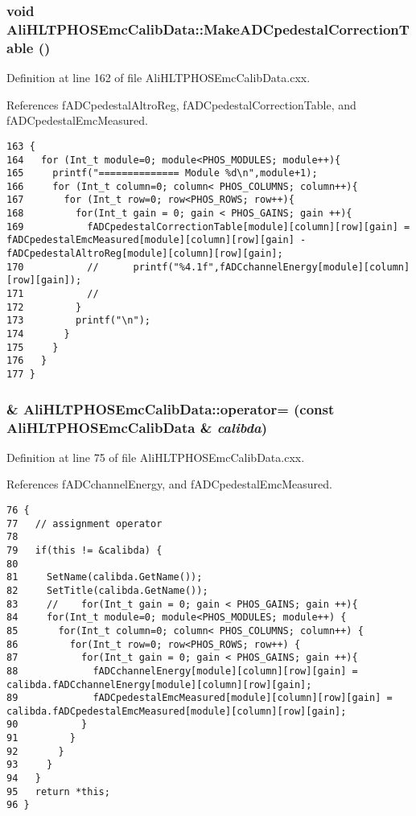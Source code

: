 \subsubsection{\setlength{\rightskip}{0pt plus 5cm}void Ali\-HLTPHOSEmc\-Calib\-Data::Make\-ADCpedestal\-Correction\-Table ()}\label{classAliHLTPHOSEmcCalibData_AliHLTPHOSEmcCalibDataa11}




Definition at line 162 of file Ali\-HLTPHOSEmc\-Calib\-Data.cxx.

References f\-ADCpedestal\-Altro\-Reg, f\-ADCpedestal\-Correction\-Table, and f\-ADCpedestal\-Emc\-Measured.

\footnotesize\begin{verbatim}163 {
164   for (Int_t module=0; module<PHOS_MODULES; module++){
165     printf("============== Module %d\n",module+1);
166     for (Int_t column=0; column< PHOS_COLUMNS; column++){
167       for (Int_t row=0; row<PHOS_ROWS; row++){
168         for(Int_t gain = 0; gain < PHOS_GAINS; gain ++){ 
169           fADCpedestalCorrectionTable[module][column][row][gain] = fADCpedestalEmcMeasured[module][column][row][gain] - fADCpedestalAltroReg[module][column][row][gain];
170           //      printf("%4.1f",fADCchannelEnergy[module][column][row][gain]);
171           //
172         }
173         printf("\n");
174       }
175     }
176   }    
177 }
\end{verbatim}\normalsize 


\subsubsection{ \& Ali\-HLTPHOSEmc\-Calib\-Data::operator= (const {\bf Ali\-HLTPHOSEmc\-Calib\-Data} \& {\em calibda})}\label{classAliHLTPHOSEmcCalibData_AliHLTPHOSEmcCalibDataa3}




Definition at line 75 of file Ali\-HLTPHOSEmc\-Calib\-Data.cxx.

References f\-ADCchannel\-Energy, and f\-ADCpedestal\-Emc\-Measured.

\footnotesize\begin{verbatim}76 {
77   // assignment operator
78 
79   if(this != &calibda) { 
80 
81     SetName(calibda.GetName());
82     SetTitle(calibda.GetName());
83     //    for(Int_t gain = 0; gain < PHOS_GAINS; gain ++){
84     for(Int_t module=0; module<PHOS_MODULES; module++) {
85       for(Int_t column=0; column< PHOS_COLUMNS; column++) {
86         for(Int_t row=0; row<PHOS_ROWS; row++) {
87           for(Int_t gain = 0; gain < PHOS_GAINS; gain ++){
88             fADCchannelEnergy[module][column][row][gain] = calibda.fADCchannelEnergy[module][column][row][gain];
89             fADCpedestalEmcMeasured[module][column][row][gain] = calibda.fADCpedestalEmcMeasured[module][column][row][gain];
90           }
91         }
92       }
93     }
94   }
95   return *this;
96 }
\end{verbatim}\normalsize 


